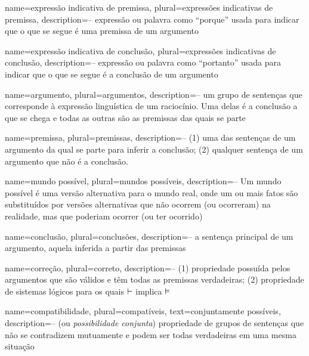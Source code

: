 

\makeglossaries



{
 name=expressão indicativa de premissa,
 plural=expressões indicativas de premissa,
 description={-- expressão ou palavra como ``porque'' usada para indicar que o que se segue é uma premissa de um argumento}
}

{
 name=expressão indicativa de conclusão,
 plural=expressões indicativas de conclusão,
 description={-- expressão ou palavra como ``portanto'' usada para indicar que o que se segue é a conclusão de um argumento}
}

{
 name=argumento,
 plural=argumentos,
 description={-- um grupo de sentenças que corresponde à expressão linguística de um raciocínio. Uma delas é a conclusão a que se chega e todas as outras são as premissas das quais se parte}
}

{
 name=premissa,
 plural=premissas,
 description={-- (1) uma das sentenças de um argumento da qual se parte para inferir a conclusão; (2) qualquer sentença de um argumento que não é a conclusão.}
}

{
 name=mundo possível,
 plural=mundos possíveis,
 description={-- Um mundo possível é uma versão alternativa para o mundo real, onde um ou mais fatos são substituídos por versões alternativas que não ocorrem (ou ocorreram) na realidade, mas que poderiam ocorrer (ou ter ocorrido)}
}

{
 name=conclusão,
 plural=conclusões,
 description={-- a sentença principal de um argumento, aquela inferida a partir das premissas}
}

{
 name=correção,
 plural=correto,
 description={-- (1) propriedade possuída pelos argumentos que são válidos e têm todas as premissas verdadeiras; (2) propriedade de sistemas lógicos para os quais $\vdash$ implica $\vDash$}
}

{
 name=compatibilidade,
 plural=compatíveis,
 text={conjuntamente possíveis}, %
 description={-- (ou \textit{possibilidade conjunta}) propriedade de grupos de sentenças que não se contradizem mutuamente e podem ser todas verdadeiras em uma mesma situação}
}


